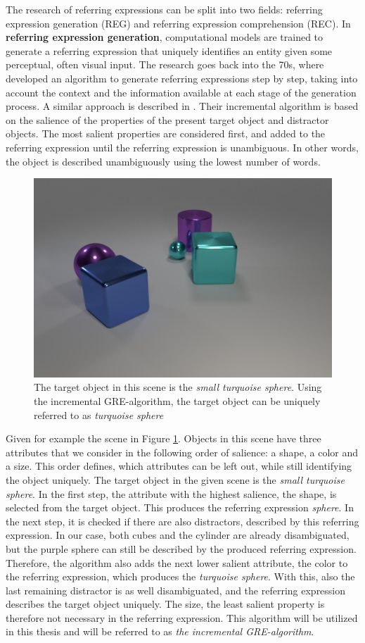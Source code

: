 The research of referring expressions can be split into two fields: referring expression generation (REG) and referring expression comprehension (REC).
In \textbf{referring expression generation}, computational models are trained to generate a referring expression that uniquely identifies an entity given some perceptual, often visual input.
The research goes back into the 70s, where \citet{Winograd1972} developed an algorithm to generate referring expressions step by step, taking into account the context and the information available at each stage of the generation process.
A similar approach is described in \citep{Dale1995}.
Their incremental algorithm is based on the salience of the properties of the present target object and distractor objects.
The most salient properties are considered first, and added to the referring expression until the referring expression is unambiguous.
In other words, the object is described unambiguously using the lowest number of words.

\begin{figure}[ht]
    \centering
    \includegraphics[width=0.5\linewidth]{figures/CLEVR_dale-5.png}
    \caption{The target object in this scene is the \emph{small turquoise sphere}. Using the incremental GRE-algorithm, the target object can be uniquely referred to as \emph{turquoise sphere}}
    \label{fig:incremental-algorithm}
\end{figure}

Given for example the scene in Figure \ref{fig:incremental-algorithm}.
Objects in this scene have three attributes that we consider in the following order of salience: a shape, a color and a size.
This order defines, which attributes can be left out, while still identifying the object uniquely.
The target object in the given scene is the \emph{small turquoise sphere}.
In the first step, the attribute with the highest salience, the shape, is selected from the target object.
This produces the referring expression \emph{sphere}.
In the next step, it is checked if there are also distractors, described by this referring expression.
In our case, both cubes and the cylinder are already disambiguated, but the purple sphere can still be described by the produced referring expression.
Therefore, the algorithm also adds the next lower salient attribute, the color to the referring expression, which produces the \emph{turquoise sphere}.
With this, also the last remaining distractor is as well disambiguated, and the referring expression describes the target object uniquely.
The size, the least salient property is therefore not necessary in the referring expression.
This algorithm will be utilized in this thesis and will be referred to as \emph{the incremental GRE-algorithm}.

